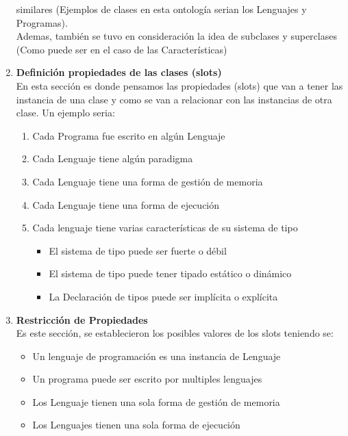 \documentclass[12pt, titlepage, a4paper]{article}
\begin{document}
\begin{enumerate}
{           similares (Ejemplos de clases en esta ontología serian los 
           Lenguajes y Programas).\\

           Ademas, también se tuvo en consideración la idea 
           de subclases y superclases (Como puede ser en el caso 
           de las Características)}
    \item {\textbf{Definición propiedades de las clases (slots)}\\
           En esta sección es donde pensamos las propiedades (slots) 
           que van a tener las instancia de una clase y como 
           se van a relacionar con las instancias de otra clase. 
           Un ejemplo seria:
           \begin{enumerate}
                \item {Cada Programa fue escrito en algún Lenguaje}
                \item {Cada Lenguaje tiene algún paradigma}
                \item {Cada Lenguaje tiene una forma de gestión de memoria}
                \item {Cada Lenguaje tiene una forma de ejecución}
                \item Cada lenguaje tiene varias características de su sistema de tipo
                \begin{itemize}
                    \item {El sistema de tipo puede ser fuerte o débil}
                    \item {El sistema de tipo puede tener tipado estático o dinámico}
                    \item {La Declaración de tipos puede ser implícita o explícita}
                \end{itemize}
           \end{enumerate}}
    \item {\textbf{Restricción de Propiedades}\\
          Es este sección, se establecieron los posibles valores de 
          los slots teniendo se: 
          \begin{itemize}
            \item {Un lenguaje de programación es una instancia de Lenguaje}
            \item {Un programa puede ser escrito por multiples lenguajes}
            \item {Los Lenguaje tienen una sola forma de gestión de memoria}
            \item {Los Lenguajes tienen una sola forma de ejecución}

\end{itemize}}
\end{enumerate}
\end{document}
